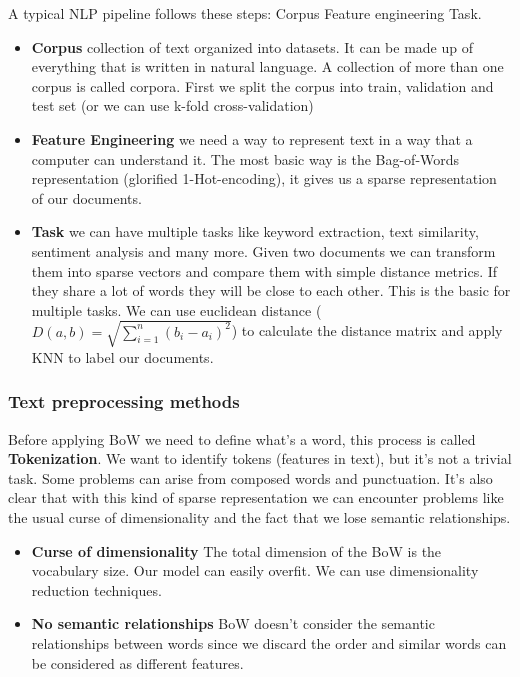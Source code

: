 A typical NLP pipeline follows these steps: Corpus \ra Feature engineering \ra Task.

\begin{itemize}
    \item \textbf{Corpus} \ra collection of text organized into datasets. It can be made up of everything that is written in natural language. A collection of more than one corpus is called corpora. First we split the corpus into train, validation and test set (or we can use k-fold cross-validation)
    \item \textbf{Feature Engineering} \ra we need a way to represent text in a way that a computer can understand it. The most basic way is the Bag-of-Words representation (glorified 1-Hot-encoding), it gives us a sparse representation of our documents.
    \item \textbf{Task} \ra we can have multiple tasks like keyword extraction, text similarity, sentiment analysis and many more. Given two documents we can transform them into sparse vectors and compare them with simple distance metrics. If they share a lot of words they will be close to each other. This is the basic for multiple tasks. We can use euclidean distance ($D(a,b) = \sqrt{\sum_{i=1}^{n}(b_i-a_i)^2}$) to calculate the distance matrix and apply KNN to label our documents.
\end{itemize}


\subsubsection{Text preprocessing methods}

Before applying BoW we need to define what's a word, this process is called \textbf{Tokenization}. We want to identify tokens (features in text), but it's not a trivial task. Some problems can arise from composed words and punctuation. It's also clear that with this kind of sparse representation we can encounter problems like the usual curse of dimensionality and the fact that we lose semantic relationships.

\begin{itemize}
    \item \textbf{Curse of dimensionality} \ra The total dimension of the BoW is the vocabulary size. Our model can easily overfit. We can use dimensionality reduction techniques.
    \item \textbf{No semantic relationships} \ra BoW doesn't consider the semantic relationships between words since we discard the order and similar words can be considered as different features. 
\end{itemize}

